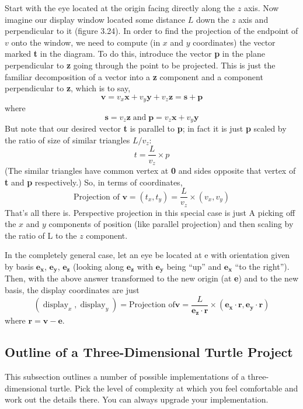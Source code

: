 \documentclass{book}
\begin{document}
Start with the eye located at the origin facing directly along the $z$ axis. 
Now imagine our display window located some distance $L$ down the $z$
axis and perpendicular to it (figure 3.24). In order to find the projection
of the endpoint of $v$ onto the window, we need to compute (in $x$ and $y$
coordinates) the vector marked \textbf{t} in the diagram. To do this, introduce
the vector \textbf{p} in the plane perpendicular to \textbf{z} going through the point to
be projected. This is just the familiar decomposition of a vector into a
\textbf{z} component and a component perpendicular to \textbf{z}, which is to say,
$$\mathbf{v}=v_x\mathbf{x}+v_y\mathbf{y}+v_z\mathbf{z} = \mathbf{s} + \mathbf{p}$$
 where
$$\mathbf{s} = v_z\mathbf{z} \operatorname{and} \mathbf{p} = v_z\mathbf{x} + v_y\mathbf{y}$$
 But note that our desired vector \textbf{t} is parallel to \textbf{p}; in fact it is just \textbf{p}
scaled by the ratio of size of similar triangles $L/v_z$:
$$t = \frac{L}{v_z} \times p$$
 (The similar triangles have common vertex at \textbf{0} and sides opposite that
vertex of \textbf{t} and \textbf{p} respectively.) So, in terms of coordinates,
$$\text{Projection of } \mathbf{v} = (t_x, t_y) = \frac{L}{v_z} \times (v_x, v_y)$$
 That's all there is. Perspective projection in this special case is just
A picking off the $x$ and $y$ components of position (like parallel projection)
and then scaling by the ratio of L to the $z$ component.

In the completely general case, let an eye be located at e with orientation given by basis $\mathbf{e_x}$, $\mathbf{e_y}$, $\mathbf{e_z}$ (looking along $\mathbf{e_z}$ with $\mathbf{e_y}$ being ``up'' and
$\mathbf{e_x}$ ``to the right''). Then, with the above answer transformed to the new
origin (at \textbf{e}) and to the new basis, the display coordinates are just
$$(\operatorname{display}_x, \operatorname{display}_y) = \text{Projection of} \mathbf{v} = \frac{L}{\mathbf{e_z} \cdot \mathbf{r}} \times (\mathbf{e_x} \cdot \mathbf{r}, \mathbf{e_y} \cdot \mathbf{r})$$
 where $\mathbf{r} = \mathbf{v} - \mathbf{e}$.

\subsection{Outline of a Three-Dimensional Turtle Project}

This subsection outlines a number of possible implementations of a
three-dimensional turtle. Pick the level of complexity at which you feel
comfortable and work out the details there. You can always upgrade
your implementation.
\end{document}
